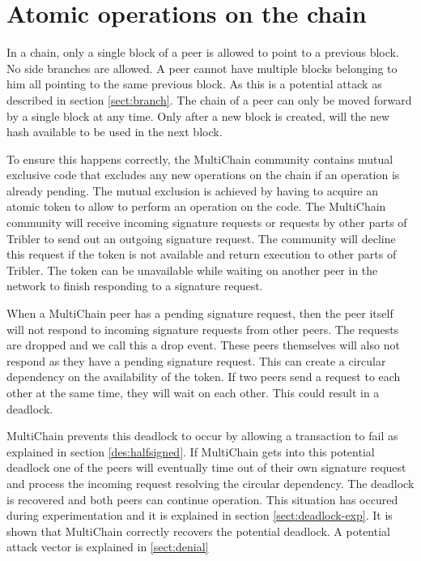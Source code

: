 \section{Atomic operations on the chain}
\label{sect:deadlock}
In a chain, only a single block of a peer is allowed to point to a previous block.
No side branches are allowed.
A peer cannot have multiple blocks belonging to him all pointing to the same previous block.
As this is a potential attack as described in section \ref{sect:branch}.
The chain of a peer can only be moved forward by a single block at any time.
Only after a new block is created, will the new hash available to be used in the next block.

To ensure this happens correctly, the MultiChain community contains mutual exclusive code
that excludes any new operations on the chain if an operation is already pending.
The mutual exclusion is achieved by having to acquire an atomic token to allow to perform an operation on the code.
The MultiChain community will receive incoming signature requests
or requests by other parts of Tribler to send out an outgoing signature request.
The community will decline this request if the token is not available and
return execution to other parts of Tribler.
The token can be unavailable while waiting on another peer in the network to finish responding to a signature request.

When a MultiChain peer has a pending signature request,
then the peer itself will not respond to incoming signature requests from other peers.
The requests are dropped and we call this a drop event.
These peers themselves will also not respond as they have a pending signature request.
This can create a circular dependency on the availability of the token.
If two peers send a request to each other at the same time, they will wait on each other.
This could result in a deadlock.

MultiChain prevents this deadlock to occur by allowing a transaction to fail
as explained in section \ref{des:halfsigned}.
If MultiChain gets into this potential deadlock one of the peers will eventually time out of their own signature request
and process the incoming request resolving the circular dependency.
The deadlock is recovered and both peers can continue operation.
This situation has occured during experimentation and it is explained in section \ref{sect:deadlock-exp}.
It is shown that MultiChain correctly recovers the potential deadlock.
A potential attack vector is explained in \ref{sect:denial}

